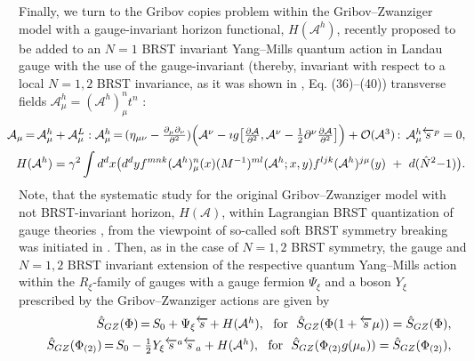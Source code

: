 \documentclass[10pt]{article}
\begin{document}
Finally, we turn to the Gribov copies problem \cite{Gribov} within the Gribov--Zwanziger model
\cite{Zwanziger}  with a gauge-invariant horizon functional, $H(\mathcal{A}^h)$, recently
proposed to be added to an $N=1$ BRST invariant Yang--Mills quantum action \cite{Pereira}
in Landau gauge with the use of the gauge-invariant (thereby, invariant with respect
to a local $N=1,2$ BRST invariance, as it was shown in \cite{reshmosh}, Eq. (36)--(40))
transverse fields $\mathcal{A}^h_\mu = (\mathcal{A}^{h})^{n}_{\mu} t^n$ \cite{SemenovTyanshan}:
\begin{eqnarray}\label{gitrans}
&\hspace{-1.0em}&  \hspace{-1em} \textstyle \mathcal{A}_{\mu}\hspace{-0.1em}= \hspace{-0.1em}\mathcal{A}^h_{\mu}+  \mathcal{A}^L_{\mu}:  \mathcal{A}^h_{\mu}\hspace{-0.1em}
=\hspace{-0.1em}(\eta_{\mu\nu}- \frac{\partial_\mu\partial_\nu}{\partial^2})\Big(\mathcal{A}^{\nu} -\imath g \big[\frac{\partial \mathcal{A}}{\partial^2},
\mathcal{A}^\nu - \frac{1}{2} \partial^\nu\frac{\partial \mathcal{A}}{\partial^2}\big]  \Big)+ \mathcal{O}(\mathcal{A}^3)\hspace{-0.1em} : \, \mathcal{A}^h_{\mu}\overleftarrow{s}^p=0 ,\\
&\hspace{-1.0em}& \hspace{-1em} \label{FuncM}
H(\mathcal{A}^h)=\gamma^2\int d^dx\big( d^dy f^{mnk}(\mathcal{A}^h)^n_{\mu}(x)(M^{-1})^{ml}(\mathcal{A}^h;x,y)f^{ljk} (\mathcal{A}^h)^{j\mu}(y)\ +\ d(\hat{N}^2{%
-}1)\big).
\end{eqnarray}
Note, that the systematic study for the original   Gribov--Zwanziger model
\cite{Zwanziger} with not BRST-invariant horizon, $H(\mathcal{A})$, within  Lagrangian BRST quantization of gauge theories \cite{bv}, \cite{ht}    from  the viewpoint of so-called soft BRST symmetry breaking was initiated in \cite{llr1}.
 Then, as in the case of $N=1,2$ BRST symmetry, the gauge and $N=1,2$ BRST invariant extension
of the respective quantum Yang--Mills action within the $R_\xi$-family of gauges with a gauge
fermion $\Psi_\xi$ and a boson $Y_\xi$ prescribed by the Gribov--Zwanziger actions are given by
\begin{eqnarray}
\label{brstinvgzN1} &&\textstyle  \hat{S}_{GZ}(\Phi) \hspace{-0.1em}= \hspace{-0.1em}S_0
+ \Psi_\xi\overleftarrow{s} \hspace{-0.1em}+ H(\mathcal{A}^h) ,\ \
\mathrm{for } \ \  \hat{S}_{GZ}(\Phi(1+\overleftarrow{s}\mu))=\hat{S}_{GZ}(\Phi),\\
\label{brstinvgzN2} &&\textstyle  \hat{S}_{GZ}(\Phi_{(2)}) \hspace{-0.1em}= \hspace{-0.1em}S_0
-\frac{1}{2}Y_\xi \overleftarrow{s}^a\overleftarrow{s}_a+ H(\mathcal{A}^h) ,\ \
\mathrm{for } \ \   \hat{S}_{GZ}(\Phi_{(2)}g(\mu_a))=\hat{S}_{GZ}(\Phi_{(2)}),
\end{eqnarray}
\end{document}
